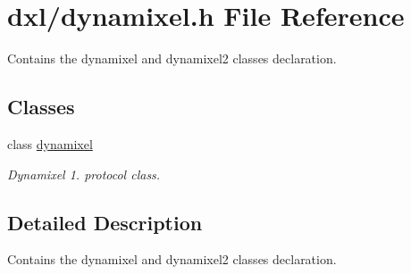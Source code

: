 \hypertarget{a00013}{}\section{dxl/dynamixel.h File Reference}
\label{a00013}


Contains the dynamixel and dynamixel2 classes declaration.  


\subsection*{Classes}
\begin{DoxyCompactItemize}
\item 
class \hyperlink{a00003}{dynamixel}
\begin{DoxyCompactList}\small\item\em Dynamixel 1. protocol class. \end{DoxyCompactList}\end{DoxyCompactItemize}


\subsection{Detailed Description}
Contains the dynamixel and dynamixel2 classes declaration. 

